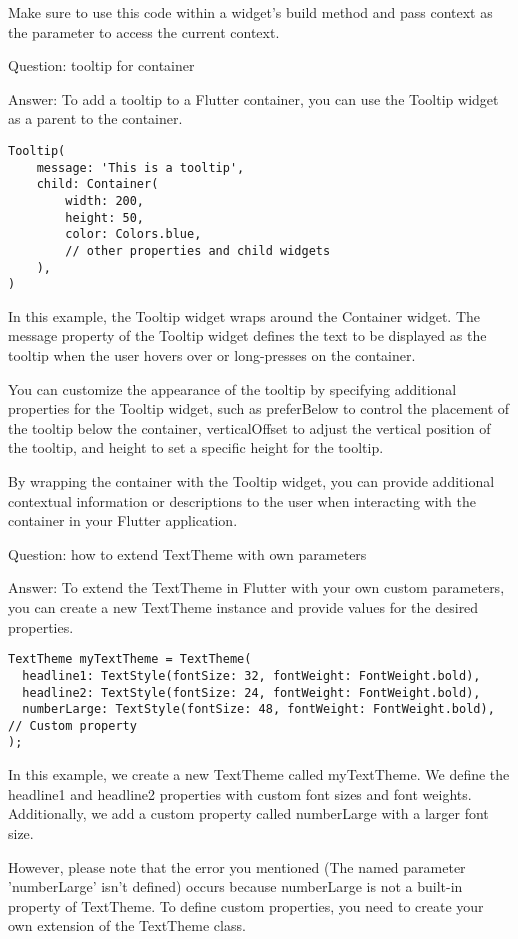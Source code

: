 Make sure to use this code within a widget's build method and pass context as the parameter to access the current 
context.

Question: tooltip for container

Answer: To add a tooltip to a Flutter container, you can use the Tooltip widget as a parent to the container. 

\begin{lstlisting}
Tooltip(
    message: 'This is a tooltip',
    child: Container(
        width: 200,
        height: 50,
        color: Colors.blue,
        // other properties and child widgets
    ),
)      
\end{lstlisting}

In this example, the Tooltip widget wraps around the Container widget. The message property of the Tooltip widget 
defines the text to be displayed as the tooltip when the user hovers over or long-presses on the container.

You can customize the appearance of the tooltip by specifying additional properties for the Tooltip widget, such 
as preferBelow to control the placement of the tooltip below the container, verticalOffset to adjust the vertical 
position of the tooltip, and height to set a specific height for the tooltip.

By wrapping the container with the Tooltip widget, you can provide additional contextual information or descriptions 
to the user when interacting with the container in your Flutter application.

Question: how to extend TextTheme with own parameters

Answer: To extend the TextTheme in Flutter with your own custom parameters, you can create a new TextTheme instance 
and provide values for the desired properties.

\begin{lstlisting}
TextTheme myTextTheme = TextTheme(
  headline1: TextStyle(fontSize: 32, fontWeight: FontWeight.bold),
  headline2: TextStyle(fontSize: 24, fontWeight: FontWeight.bold),
  numberLarge: TextStyle(fontSize: 48, fontWeight: FontWeight.bold), // Custom property
);
\end{lstlisting}

In this example, we create a new TextTheme called myTextTheme. We define the headline1 and headline2 properties with 
custom font sizes and font weights. Additionally, we add a custom property called numberLarge with a larger font size.

However, please note that the error you mentioned (The named parameter 'numberLarge' isn't defined) occurs because 
numberLarge is not a built-in property of TextTheme. To define custom properties, you need to create your own 
extension of the TextTheme class.

